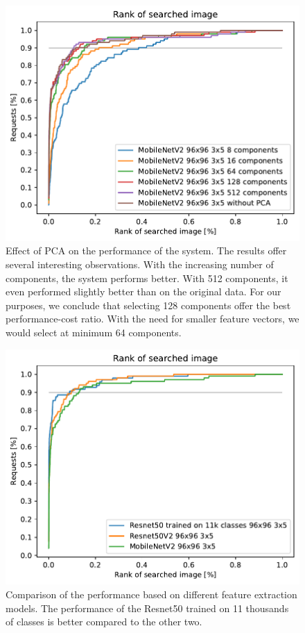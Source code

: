 \begin{figure}
    \centering
    \includegraphics[width=0.8\linewidth]{graphs/6fbd4f70810e1f63f400ef601c1cdba0fd1635749810aa2347a4ff26e6fccf47.pdf}
    \caption{Effect of PCA on the performance of the system. The results offer several interesting observations. With the increasing number of components, the system performs better. With 512 components, it even performed slightly better than on the original data. For our purposes, we conclude that selecting 128 components offer the best performance-cost ratio. With the need for smaller feature vectors, we would select at minimum 64 components.}
    \label{fig:pca}
\end{figure}

\begin{figure}
    \centering
    \includegraphics[width=0.8\linewidth]{graphs/2536f6c96149dea24dae84dbf52f760d7d58b0dffa7d660656e1784d9dca277f.pdf}
    \caption{Comparison of the performance based on different feature extraction models. The performance of the Resnet50 trained on 11 thousands of classes is better compared to the other two.}
    \label{fig:networks}
\end{figure}

